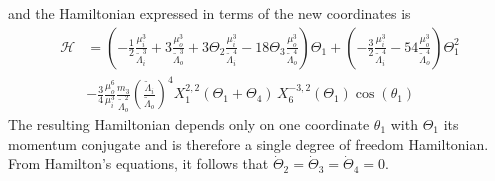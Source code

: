 and the Hamiltonian expressed in terms of the new coordinates is 
\begin{equation}
    \begin{aligned}
        \mathcal{H}&=\left(- \frac{1}{2} \frac{\mu_i^3}{\tilde{\Lambda}_i^3}
         +3 \frac{\mu_o^3}{\tilde{\Lambda}_o^3}+3\Theta_2 \frac{\mu_i^3}
         {\tilde{\Lambda}_i^4} -18\Theta_3\frac{\mu_o^3}{\tilde{\Lambda}_o^4} 
        \right)\Theta_1 +
         \left(-\frac{3}{2}\frac{\mu_i^3}{\tilde{\Lambda}_i^4} - 
         54\frac{\mu_o^3}{\tilde{\Lambda}_o^4}\right)\Theta_1^2\\
        &-\frac{3}{4} \frac{\mu_o^6}{\mu_i^3} 
        \frac{m_3}{\tilde{\Lambda}_o^2} \left(\frac{\tilde{\Lambda}_i}
        {\tilde{\Lambda}_o}\right)^4
        X^{2,2}_1(\Theta_1+\Theta_4)\,X^{-3,2}_6(\Theta_1)\cos(\theta_1)
    \end{aligned}
    \label{eq:hamiltonian_sdof_full}
\end{equation}
The resulting Hamiltonian depends only on one coordinate $\theta_1$ with
$\Theta_1$ its momentum conjugate and 
is therefore a single degree of freedom Hamiltonian. From Hamilton's
equations, it follows that $\dot{\Theta}_2=\dot{\Theta}_3=\dot{\Theta}_4=0$.


